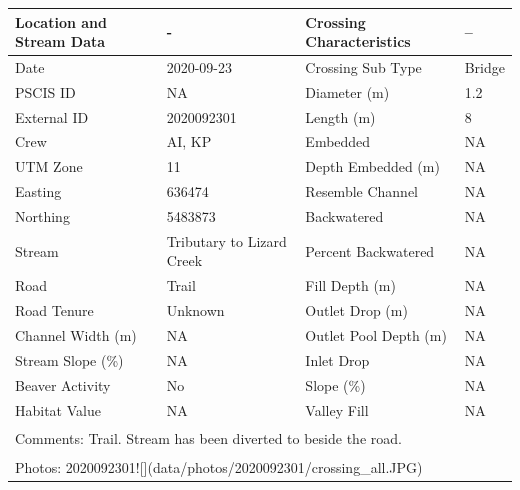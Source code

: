 \documentclass[
]{book}
\begin{document}
\begin{tabular}{l|l|l|l}
\hline
Location and Stream Data & - & Crossing Characteristics & --\\
\hline
Date & 2020-09-23 & Crossing Sub Type & Bridge\\
\hline
PSCIS ID & NA & Diameter (m) & 1.2\\
\hline
External ID & 2020092301 & Length (m) & 8\\
\hline
Crew & AI, KP & Embedded & NA\\
\hline
UTM Zone & 11 & Depth Embedded (m) & NA\\
\hline
Easting & 636474 & Resemble Channel & NA\\
\hline
Northing & 5483873 & Backwatered & NA\\
\hline
Stream & Tributary to Lizard Creek & Percent Backwatered & NA\\
\hline
Road & Trail & Fill Depth (m) & NA\\
\hline
Road Tenure & Unknown & Outlet Drop (m) & NA\\
\hline
Channel Width (m) & NA & Outlet Pool Depth (m) & NA\\
\hline
Stream Slope (\%) & NA & Inlet Drop & NA\\
\hline
Beaver Activity & No & Slope (\%) & NA\\
\hline
Habitat Value & NA & Valley Fill & NA\\
\hline
\multicolumn{4}{l}{\textsuperscript{} Comments: Trail. Stream has been diverted to beside the road.}\\
\multicolumn{4}{l}{\textsuperscript{} Photos: 2020092301![](data/photos/2020092301/crossing\_all.JPG)}\\
\end{tabular}
\end{document}
